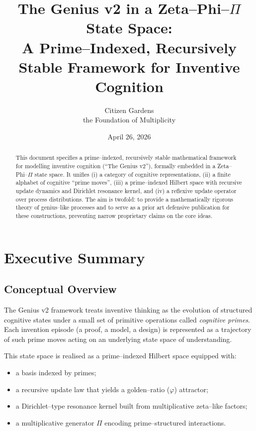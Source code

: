 \documentclass[11pt]{article}
\title{The Genius v2 in a Zeta--Phi--$\Pi$ State Space:\\
A Prime--Indexed, Recursively Stable Framework for Inventive Cognition}
\author{Citizen Gardens \\ the Foundation of Multiplicity}
\date{April 26, 2026}
\begin{document}
\maketitle

\begin{abstract}
This document specifies a prime--indexed, recursively stable mathematical framework for modelling inventive cognition (``The Genius v2''), formally embedded in a Zeta--Phi--$\Pi$ state space.
It unifies (i) a category of cognitive representations, (ii) a finite alphabet of cognitive ``prime moves'', (iii) a prime--indexed Hilbert space with recursive update dynamics and Dirichlet resonance kernel, and (iv) a reflexive update operator over process distributions.
The aim is twofold: to provide a mathematically rigorous theory of genius--like processes and to serve as a prior art defensive publication for these constructions, preventing narrow proprietary claims on the core ideas.
\end{abstract}

\tableofcontents

\section{Executive Summary}

\subsection{Conceptual Overview}

The Genius v2 framework treats inventive thinking as the evolution of structured cognitive states under a small set of primitive operations called \emph{cognitive primes}.
Each invention episode (a proof, a model, a design) is represented as a trajectory of such prime moves acting on an underlying state space of understanding.

This state space is realised as a prime--indexed Hilbert space equipped with:
\begin{itemize}[nosep]
  \item a basis indexed by primes;
  \item a recursive update law that yields a golden--ratio ($\varphi$) attractor;
  \item a Dirichlet--type resonance kernel built from multiplicative zeta--like factors;
  \item a multiplicative generator $\Pi$ encoding prime--structured interactions.
\end{itemize}
\end{document}
